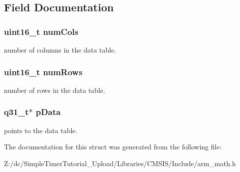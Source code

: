 \subsection{Field Documentation}
\hypertarget{structarm__bilinear__interp__instance__q31_a4bb5ec0d13eb4c9cf887aa8366a44117}{
\subsubsection[{num\-Cols}]{\setlength{\rightskip}{0pt plus 5cm}uint16\-\_\-t num\-Cols}}\label{structarm__bilinear__interp__instance__q31_a4bb5ec0d13eb4c9cf887aa8366a44117}
number of columns in the data table. \hypertarget{structarm__bilinear__interp__instance__q31_a1bcf80ccdc2acc29198f1592ae300390}{
\subsubsection[{num\-Rows}]{\setlength{\rightskip}{0pt plus 5cm}uint16\-\_\-t num\-Rows}}\label{structarm__bilinear__interp__instance__q31_a1bcf80ccdc2acc29198f1592ae300390}
number of rows in the data table. \hypertarget{structarm__bilinear__interp__instance__q31_ad296f76577326ff280726323536eed6d}{
\subsubsection[{p\-Data}]{\setlength{\rightskip}{0pt plus 5cm}q31\-\_\-t$\ast$ p\-Data}}\label{structarm__bilinear__interp__instance__q31_ad296f76577326ff280726323536eed6d}
points to the data table. 

The documentation for this struct was generated from the following file\-:\begin{DoxyCompactItemize}
\item 
Z\-:/dc/\-Simple\-Timer\-Tutorial\-\_\-\-Upload/\-Libraries/\-C\-M\-S\-I\-S/\-Include/arm\-\_\-math.\-h\end{DoxyCompactItemize}
